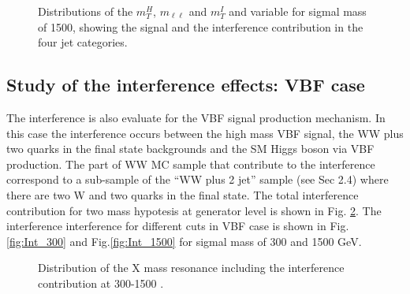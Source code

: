 \begin{figure}[htb]
\caption{
    Distributions of the  $m_T^H$, $m_{\ell \ell}$ and $m_T^I$ and  variable for sigmal mass of 1500\GeV, showing the signal and the interference contribution in the four jet categories.}
    \label{fig:1500}
\end{figure}






\subsection{Study of the interference effects: VBF case}
\label{sec:interference_VBF}
The interference is also evaluate for the VBF signal  production mechanism. 
In this case the interference occurs between the high mass VBF signal,  the WW
plus two quarks in the final state backgrounds and the SM Higgs boson via VBF
production. The part of WW MC sample that contribute to the interference
correspond to a sub-sample of the ``WW plus 2 jet'' sample (see Sec 2.4) where there are two W and two quarks in the final state.
The total  interference contribution for two mass hypotesis at generator level is shown in Fig. \ref{fig:Int_VBF_GEN}.
The interference interference for different cuts  in VBF case is shown in  Fig.\ref{fig:Int_300} and  Fig.\ref{fig:Int_1500} for sigmal mass of 300 and 1500 GeV.\\



\begin{figure}[htbp]
\centering
{}
\caption{Distribution of the X mass resonance including the interference contribution at 300-1500 \GeV.}
    \label{fig:Int_VBF_GEN}
\end{figure}





